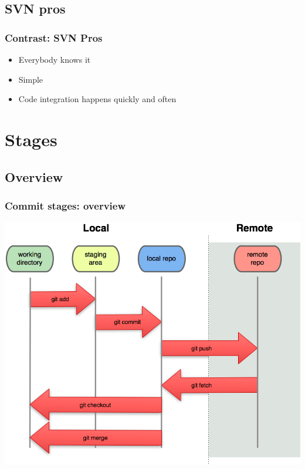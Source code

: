 \documentclass{beamer}
\begin{document}
    \subsection{SVN pros}
		\begin{frame}
			\frametitle{Contrast: SVN Pros}
			\begin{center}
			\begin{itemize}
        \item Everybody knows it
        \item Simple
        \item Code integration happens quickly and often
			\end{itemize}
			\end{center}
		\end{frame}	


	\section{Stages}
		\subsection{Overview}
		\begin{frame}
			\frametitle{Commit stages: overview}
			\begin{center}
				\includegraphics[scale=0.8]{images/fact2}
			\end{center}
		\end{frame}
\end{document}
